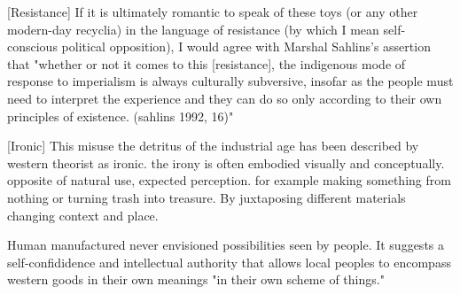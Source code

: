 [Resistance]  If it is ultimately romantic to speak of these toys (or any other modern-day recyclia) in the language of resistance (by which I mean self-conscious political opposition), I would agree with Marshal Sahlins's assertion that "whether or not it comes to this [resistance], the indigenous mode of response to imperialism is always culturally subversive, insofar as the people must need to interpret the experience and they can do so only according to their own principles of existence. (sahlins 1992, 16)"

[Ironic]  This misuse the detritus of the industrial age has been described by western theorist as ironic. the irony is often embodied visually and conceptually. opposite of natural use, expected perception. for example making something from nothing or turning trash into treasure. By juxtaposing different materials changing context and place. 

 Human manufactured never envisioned possibilities seen by people. It suggests a self-confididence and intellectual authority that allows local peoples to encompass western goods in their own meanings "in their own scheme of things." 



